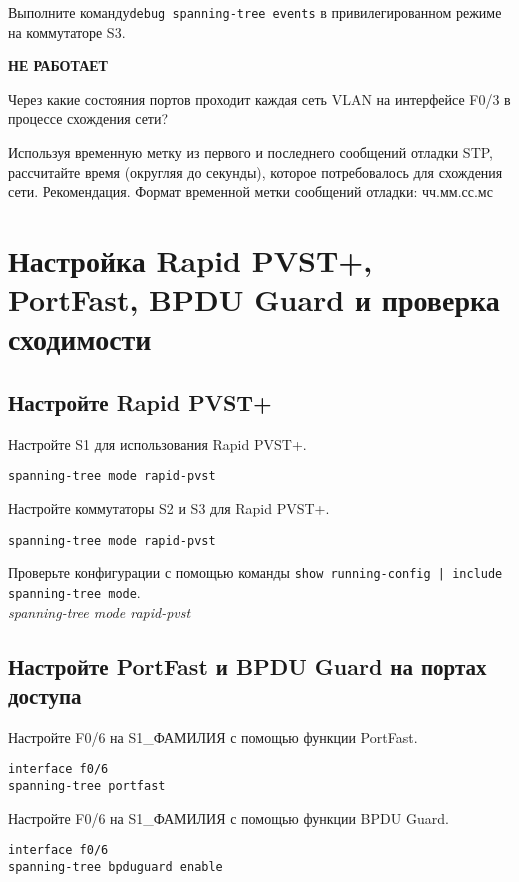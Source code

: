 Выполните команду\texttt{debug spanning-tree events} 
в привилегированном режиме на коммутаторе S3.

\textbf{НЕ РАБОТАЕТ}

Через какие состояния портов проходит каждая сеть VLAN
на интерфейсе F0/3 в процессе схождения сети?

Используя временную метку из первого и последнего сообщений отладки STP,
рассчитайте время (округляя до секунды),
которое потребовалось для схождения сети.
Рекомендация. Формат временной метки сообщений отладки: чч.мм.сс.мс

\section{Настройка Rapid PVST+, PortFast, BPDU Guard и проверка сходимости}

\subsection{Настройте Rapid PVST+}

Настройте S1 для использования Rapid PVST+.

\begin{verbatim}
spanning-tree mode rapid-pvst
\end{verbatim}

Настройте коммутаторы S2 и S3 для Rapid PVST+.

\begin{verbatim}
spanning-tree mode rapid-pvst
\end{verbatim}

Проверьте конфигурации с помощью команды
\texttt{show running-config | include spanning-tree mode}.\\

\textit{spanning-tree mode rapid-pvst}

\subsection{Настройте PortFast и BPDU Guard на портах доступа}

Настройте F0/6 на S1\_ФАМИЛИЯ с помощью функции PortFast.

\begin{verbatim}
interface f0/6
spanning-tree portfast
\end{verbatim}

Настройте F0/6 на S1\_ФАМИЛИЯ с помощью функции BPDU Guard.

\begin{verbatim}
interface f0/6
spanning-tree bpduguard enable
\end{verbatim}

